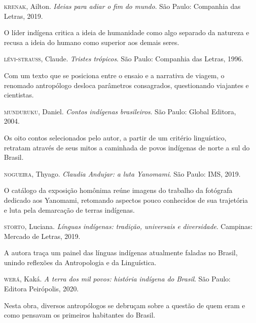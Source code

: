 \documentclass[12pt]{extarticle}
\begin{document}
\textsc{krenak}, Ailton. \textit{Ideias para adiar o fim do mundo}. São Paulo:
Companhia das Letras, 2019.

O líder indígena critica a ideia de humanidade como algo separado da
natureza e recusa a ideia do humano como superior aos demais seres.

\textsc{lévi-strauss}, Claude. \textit{Tristes trópicos}. São Paulo: Companhia das
Letras, 1996.

Com um texto que se posiciona entre o ensaio e a narrativa de viagem, o
renomado antropólogo desloca parâmetros consagrados, questionando
viajantes e cientistas.

\textsc{munduruku}, Daniel. \textit{Contos indígenas brasileiros}. São Paulo:
Global Editora, 2004.

Os oito contos selecionados pelo autor, a partir de um critério
linguístico, retratam através de seus mitos a caminhada de povos
indígenas de norte a sul do Brasil.

\textsc{nogueira}, Thyago. \textit{Claudia Andujar: a luta Yanomami}. São Paulo:
IMS, 2019.

O catálogo da exposição homônima reúne imagens do trabalho da fotógrafa
dedicado aos Yanomami, retomando aspectos pouco conhecidos de sua
trajetória e luta pela demarcação de terras indígenas.

\textsc{storto}, Luciana. \textit{Línguas indígenas: tradição, universais e
diversidade}. Campinas: Mercado de Letras, 2019.

A autora traça um painel das línguas indígenas atualmente faladas no
Brasil, unindo reflexões da Antropologia e da Linguística.

\textsc{werá}, Kaká. \textit{A terra dos mil povos: história indígena do Brasil}.
São Paulo: Editora Peirópolis, 2020.

Nesta obra, diversos antropólogos se debruçam sobre a questão de quem
eram e como pensavam os primeiros habitantes do Brasil.
\end{document}
